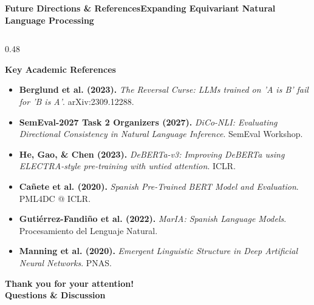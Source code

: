 \documentclass[aspectratio=169,10pt]{beamer}
\begin{document}
\begin{frame}{\textbf{Future Directions \& References}}{\textbf{Expanding Equivariant Natural Language Processing}}
\begin{columns}[T]
    \begin{column}{0.48\textwidth}
      \begin{block}{\textbf{Key Academic References}}
        \tiny
        \begin{itemize}
          \item \textbf{Berglund et al. (2023).} \textit{The Reversal Curse: LLMs trained on 'A is B' fail for 'B is A'}. arXiv:2309.12288.
          \item \textbf{SemEval-2027 Task 2 Organizers (2027).} \textit{DiCo-NLI: Evaluating Directional Consistency in Natural Language Inference}. SemEval Workshop.
          \item \textbf{He, Gao, \& Chen (2023).} \textit{DeBERTa-v3: Improving DeBERTa using ELECTRA-style pre-training with untied attention}. ICLR.
          \item \textbf{Cañete et al. (2020).} \textit{Spanish Pre-Trained BERT Model and Evaluation}. PML4DC @ ICLR.
          \item \textbf{Gutiérrez-Fandiño et al. (2022).} \textit{MarIA: Spanish Language Models}. Procesamiento del Lenguaje Natural.
          \item \textbf{Manning et al. (2020).} \textit{Emergent Linguistic Structure in Deep Artificial Neural Networks}. PNAS.
        \end{itemize}
      \end{block}
      \vspace{0.2cm}
      \centering
      {\Large\textbf{\color{UNAMNavy}Thank you for your attention!}} \\
      \vspace{0.1cm}
      {\small\textbf{\color{UNAMGold!90!black}Questions \& Discussion}}
    \end{column}
  \end{columns}
\end{frame}
\end{document}
